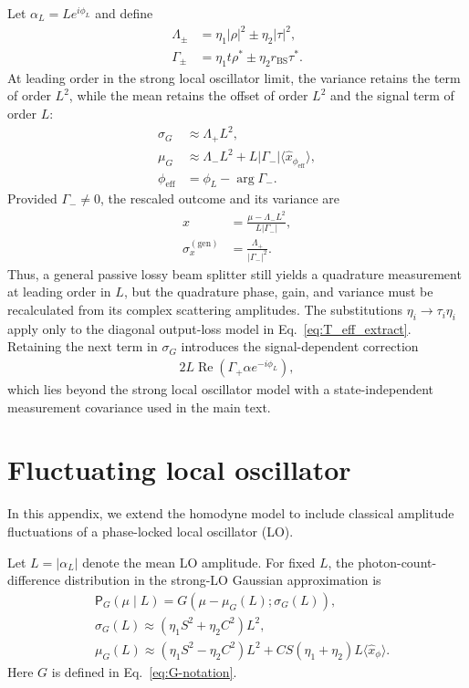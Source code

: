 \documentclass[%
final, 
superscriptaddress,
 amsmath,amssymb,amsfonts,
 aps,
 pra,
 longbibliography,
]{revtex4-2}
\newcommand{\avr}[1]{\ensuremath{\langle{#1}\rangle}}
\newcommand{\ind}[1]{\mathrm{#1}}
\newcommand{\prob}{\mathsf{P}}
\begin{document}
Let
$\alpha_L=L e^{i\phi_L}$
and define
\begin{align}
  \Lambda_{\pm}
  &=
  \eta_1|\rho|^2
  \pm
  \eta_2|\tau|^2,
  \\
  \Gamma_{\pm}
  &=
  \eta_1t\rho^*
  \pm
  \eta_2r_{\ind{BS}}\tau^*.
\end{align}
At leading order in the strong local oscillator limit, the variance retains the term of order $L^2$, while the mean retains the offset of order $L^2$ and the signal term of order $L$:
\begin{align}
  \sigma_G
  &\approx
  \Lambda_+L^2,
  \\
  \mu_G
  &\approx
  \Lambda_-L^2
  +
  L|\Gamma_-|
  \avr{\hat x_{\phi_{\ind{eff}}}},
  \\
  \phi_{\ind{eff}}
  &=
  \phi_L-\arg\Gamma_-.
\end{align}
Provided $\Gamma_-\neq0$, the rescaled outcome and its variance are
\begin{align}
  x
  &=
  \frac{
    \mu-\Lambda_-L^2
  }{
    L|\Gamma_-|
  },
  \\
  \sigma_x^{(\ind{gen})}
  &=
  \frac{
    \Lambda_+
  }{
    |\Gamma_-|^2
  }.
\end{align}
Thus, a general passive lossy beam splitter still yields a quadrature measurement at leading order in $L$, but the quadrature phase, gain, and variance must be recalculated from its complex scattering amplitudes. The substitutions
$\eta_i\to\tau_i\eta_i$
apply only to the diagonal output-loss model in Eq.~\eqref{eq:T_eff_extract}. Retaining the next term in $\sigma_G$ introduces the signal-dependent correction
\begin{align}
  2L\operatorname{Re}
  \left(
    \Gamma_+\alpha e^{-i\phi_L}
  \right),
\end{align}
which lies beyond the strong local oscillator model with a state-independent measurement covariance used in the main text.

\section{Fluctuating local oscillator}\label{sec:fluc-LO}
In this appendix, we extend the homodyne model to include classical amplitude fluctuations of a phase-locked local oscillator (LO).%

Let $L=|\alpha_L|$ denote the mean LO amplitude. For fixed $L$, the photon-count-difference distribution in the strong-LO Gaussian approximation is~\cite{naumchik2025asymmetryeffectshomodyneheterodyne}
\begin{align}
  &
  \label{eq:Gaussian}
    \prob_G(\mu\mid L)=G(\mu-\mu_G(L);\sigma_G(L)),
    \\
  &
    \label{eq:sigma_G}
    \sigma_G(L)\approx
    (\eta_1S^2+\eta_2C^2)L^2,
  \\
  &
    \label{eq:mu_G}
    \mu_G(L)\approx
    (\eta_1S^2-\eta_2C^2)L^2
    +CS (\eta_1+\eta_2)L\avr{\hat{x}_\phi}.
\end{align}
Here $G$ is defined in Eq.~\eqref{eq:G-notation}.
\end{document}
